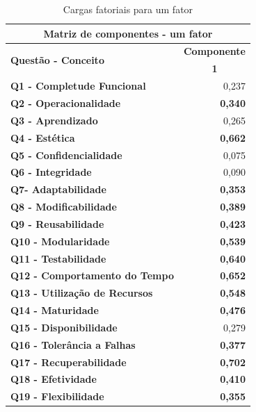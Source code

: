      
          \begin{longtable}{rr}
          \caption{Cargas fatoriais para um  fator}
                         \label{1-fator}
          \\\hline
          \multicolumn{2}{c}{\textbf{Matriz de componentes - um fator}} \\
          \hline
          \multicolumn{1}{l}{\multirow{2}[2]{*}{\textbf{Questão - Conceito}}} & \multicolumn{1}{c}{\textbf{Componente}} \\
          \multicolumn{1}{l}{} & \multicolumn{1}{c}{\textbf{1}} \\
          \multicolumn{1}{l}{\textbf{Q1 - Completude Funcional}} & 0,237 \\
          \multicolumn{1}{l}{\textbf{Q2 - Operacionalidade}} & \textbf{0,340} \\
          \multicolumn{1}{l}{\textbf{Q3 - Aprendizado}} & 0,265 \\
          \multicolumn{1}{l}{\textbf{Q4 - Estética}} & \textbf{0,662} \\
          \multicolumn{1}{l}{\textbf{Q5 - Confidencialidade}} & 0,075 \\
          \multicolumn{1}{l}{\textbf{Q6 - Integridade}} & 0,090 \\
          \multicolumn{1}{l}{\textbf{Q7- Adaptabilidade}} & \textbf{0,353} \\
          \multicolumn{1}{l}{\textbf{Q8 - Modificabilidade}} & \textbf{0,389} \\
          \multicolumn{1}{l}{\textbf{Q9 - Reusabilidade}} & \textbf{0,423} \\
          \multicolumn{1}{l}{\textbf{Q10 - Modularidade}} & \textbf{0,539} \\
          \multicolumn{1}{l}{\textbf{Q11 - Testabilidade}} & \textbf{0,640} \\
          \multicolumn{1}{l}{\textbf{Q12 - Comportamento do Tempo}} & \textbf{0,652} \\
          \multicolumn{1}{l}{\textbf{Q13 - Utilização de Recursos}} & \textbf{0,548} \\
          \multicolumn{1}{l}{\textbf{Q14 - Maturidade}} & \textbf{0,476} \\
          \multicolumn{1}{l}{\textbf{Q15 - Disponibilidade}} & 0,279 \\
          \multicolumn{1}{l}{\textbf{Q16 - Tolerância a Falhas}} & \textbf{0,377} \\
          \multicolumn{1}{l}{\textbf{Q17 - Recuperabilidade}} & \textbf{0,702} \\
          \multicolumn{1}{l}{\textbf{Q18 - Efetividade}} & \textbf{0,410} \\
          \multicolumn{1}{l}{\textbf{Q19 - Flexibilidade}} & \textbf{0,355} \\
          \hline
          \end{longtable}%
       
